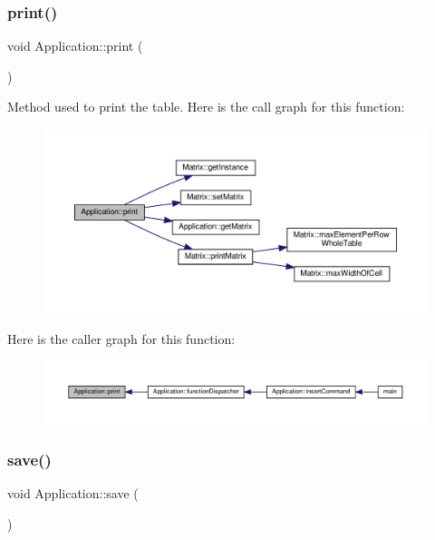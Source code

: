 \subsubsection{\texorpdfstring{print()}{print()}}
{\footnotesize\ttfamily void Application\+::print (\begin{DoxyParamCaption}{ }\end{DoxyParamCaption})\hspace{0.3cm}{\ttfamily [private]}}

Method used to print the table. Here is the call graph for this function\+:\nopagebreak
\begin{figure}[H]
\begin{center}
\leavevmode
\includegraphics[width=350pt]{class_application_a2bc1937440cb9e71dace95c3fe7ed4ea_cgraph}
\end{center}
\end{figure}
Here is the caller graph for this function\+:\nopagebreak
\begin{figure}[H]
\begin{center}
\leavevmode
\includegraphics[width=350pt]{class_application_a2bc1937440cb9e71dace95c3fe7ed4ea_icgraph}
\end{center}
\end{figure}
\mbox{\label{class_application_a2cbf94e01d55a814de35f90f4d874647}} 
\subsubsection{\texorpdfstring{save()}{save()}}
{\footnotesize\ttfamily void Application\+::save (\begin{DoxyParamCaption}{ }\end{DoxyParamCaption})\hspace{0.3cm}{\ttfamily [private]}}

